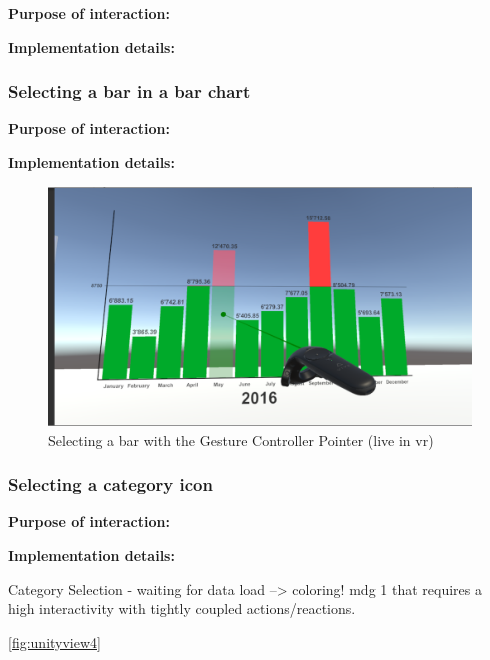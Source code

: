 \textbf{Purpose of interaction:}

\textbf{Implementation details:}


\subsubsection{Selecting a bar in a bar chart}

\textbf{Purpose of interaction:}

\textbf{Implementation details:}

\begin{figure}[h]
	\begin{center}
		\includegraphics[width=12cm]{03_Figures/08_Development/Bar_Selection.png}
		\caption{Selecting a bar with the Gesture Controller Pointer (live in \gls{vr})}
		\label{fig:unitybarselection}
	\end{center}
\end{figure}


\subsubsection{Selecting a category icon}

\textbf{Purpose of interaction:}

\textbf{Implementation details:}


Category Selection - waiting for data load --> coloring!
\gls{mdg} 1 that requires a high interactivity with tightly coupled actions/reactions.

\ref{fig:unityview4}



